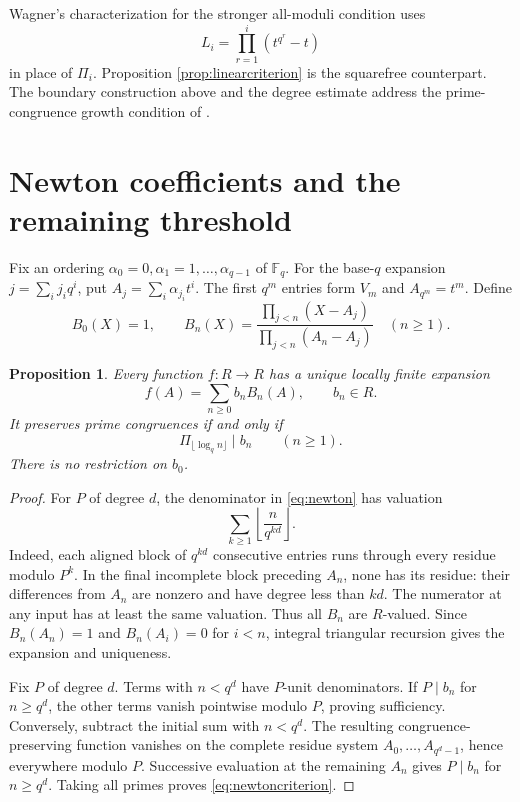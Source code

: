 \documentclass[11pt]{article}
\newtheorem{proposition}[theorem]{Proposition}
\newcommand{\F}{\mathbb F}
\begin{document}
Wagner's characterization \cite[Theorem 3.2]{W74} for the stronger
all-moduli condition uses
\[
 L_i=\prod_{r=1}^i(t^{q^r}-t)
\]
in place of $\Pi_i$. Proposition \ref{prop:linearcriterion} is the squarefree
counterpart. The boundary construction above and the degree estimate
address the prime-congruence growth condition of \cite{BN}.

\section{Newton coefficients and the remaining threshold}
Fix an ordering $\alpha_0=0,\alpha_1=1,\ldots,\alpha_{q-1}$ of $\F_q$.
For the base-$q$ expansion $j=\sum_i j_iq^i$, put
$A_j=\sum_i\alpha_{j_i}t^i$. The first $q^m$ entries form $V_m$ and
$A_{q^m}=t^m$. Define
\begin{equation}\label{eq:newton}
 B_0(X)=1,\qquad
 B_n(X)=\frac{\prod_{j<n}(X-A_j)}{\prod_{j<n}(A_n-A_j)}\quad(n\ge1).
\end{equation}

\begin{proposition}\label{prop:newton}
Every function $f:R\to R$ has a unique locally finite expansion
\[
 f(A)=\sum_{n\ge0}b_nB_n(A),\qquad b_n\in R.
\]
It preserves prime congruences if and only if
\begin{equation}\label{eq:newtoncriterion}
 \Pi_{\lfloor\log_qn\rfloor}\mid b_n\qquad(n\ge1).
\end{equation}
There is no restriction on $b_0$.
\end{proposition}
\begin{proof}
For $P$ of degree $d$, the denominator in \eqref{eq:newton} has valuation
\[
 \sum_{k\ge1}\left\lfloor\frac n{q^{kd}}\right\rfloor.
\]
Indeed, each aligned block of $q^{kd}$ consecutive entries runs through
every residue modulo $P^k$. In the final incomplete block preceding
$A_n$, none has its residue: their differences from $A_n$ are nonzero
and have degree less than $kd$. The numerator at any input has at least
the same valuation. Thus all $B_n$ are $R$-valued. Since
$B_n(A_n)=1$ and $B_n(A_i)=0$ for $i<n$, integral triangular recursion
gives the expansion and uniqueness.

Fix $P$ of degree $d$. Terms with $n<q^d$ have $P$-unit denominators.
If $P\mid b_n$ for $n\ge q^d$, the other terms vanish pointwise modulo
$P$, proving sufficiency. Conversely, subtract the initial sum with
$n<q^d$. The resulting congruence-preserving function vanishes on the
complete residue system $A_0,\ldots,A_{q^d-1}$, hence everywhere modulo
$P$. Successive evaluation at the remaining $A_n$ gives $P\mid b_n$
for $n\ge q^d$. Taking all primes proves \eqref{eq:newtoncriterion}.
\end{proof}
\end{document}
